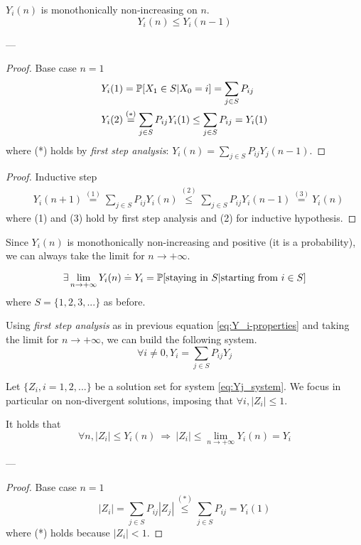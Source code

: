 	\begin{theorem}
		$Y_i(n)$ is monothonically non-increasing on $n$.
		$$ Y_i(n) \le Y_i(n-1) $$
	\end{theorem}
	---
	\begin{proof} Base case $n=1$
		\begin{equation}\begin{split} \label{eq:Y_i-properties}
			& Y_i(1) = \mathbb{P}[X_1 \in S | X_0 = i] = \sum_{j \in S} P_{ij} \\
			& Y_i(2) \stackrel{(*)}{=} \sum_{j \in S} P_{ij} Y_i(1) \le \sum_{j \in S} P_{ij} = Y_i(1)
		\end{split}\end{equation}
		where (*) holds by \emph{first step analysis}: $ Y_i(n) = \sum_{j \in S} P_{ij} Y_j(n-1) $.
	\end{proof}

	\begin{proof} Inductive step
		\begin{equation}\begin{split}
			& Y_i(n+1) \stackrel{(1)}{=} \sum_{j \in S} P_{ij} Y_i(n) \stackrel{(2)}{\le} \sum_{j \in S} P_{ij} Y_i(n-1) \stackrel{(3)}{=} Y_i(n)
		\end{split}\end{equation}
		where (1) and (3) hold by first step analysis and (2) for inductive hypothesis.
	\end{proof}

	\begin{lemma}
		Since $Y_i(n)$ is monothonically non-increasing and positive (it is a probability), we can always take the limit for $n \to +\infty$.

		$$ \exists \lim_{n \to +\infty} Y_i(n) \stackrel{.}{=} Y_i = \mathbb{P}[\text{staying in } S | \text{starting from } i \in S] $$
		where $ S = \{ 1, 2, 3, ...\} $ as before.

		Using \emph{first step analysis} as in previous equation \ref{eq:Y_i-properties} and taking the limit for $n \to +\infty $, we can build the following system.
		\begin{equation} \label{eq:Yj_system}
			\forall i \neq 0, Y_i = \sum_{j \in S} P_{ij} Y_j
		\end{equation}
	\end{lemma}

	\begin{lemma}
		Let $\{Z_i, i=1, 2, ...\}$ be a solution set for system \ref{eq:Yj_system}. We focus in particular on non-divergent solutions, imposing that $ \forall i, |Z_i| \le 1 $.

		It holds that
		$$ \forall n, |Z_i| \le Y_i(n) ~ \Rightarrow ~|Z_i| \le \lim_{n \to +\infty} Y_i(n) = Y_i $$
	\end{lemma}
	---
	\begin{proof} Base case $n=1$
		$$ |Z_i| = \sum_{j \in S} P_{ij} |Z_j| \stackrel{(*)}{\le} \sum_{j \in S} P_{ij} = Y_i(1) $$
		where (*) holds because $|Z_i| < 1$.
	\end{proof}

